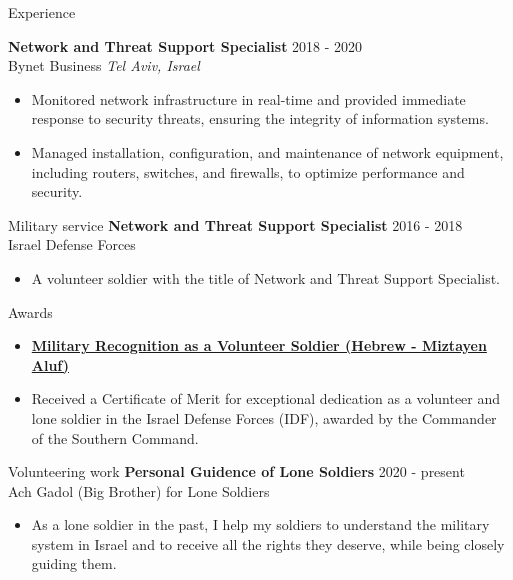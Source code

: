 \documentclass{resume}
\begin{document}
\begin{rSection}{Experience}

\textbf{Network and Threat Support Specialist} \hfill 2018 - 2020\\
Bynet Business \hfill \textit{Tel Aviv, Israel}
 \begin{itemize}
    \item Monitored network infrastructure in real-time and provided immediate response to security threats, ensuring the integrity of information systems.
    \item Managed installation, configuration, and maintenance of network equipment, including routers, switches, and firewalls, to optimize performance and security.
 \end{itemize}
\end{rSection}



\vspace{10pt}

\begin{rSection}{Military service}
	\textbf{Network and Threat Support Specialist} \hfill 2016 - 2018\\
	Israel Defense Forces 
	\begin{itemize}
		\item A volunteer soldier with the title of Network and Threat Support Specialist.
	\end{itemize}
\end{rSection} 


\vspace{10pt}

\begin{rSection}{Awards}
\begin{itemize}
 		\item\textbf{\href{https://drive.google.com/file/d/1QWiVud-gSK4n_YLskh-mxVn0zGRxDvHW/view?usp=sharing}{Military Recognition as a Volunteer Soldier (Hebrew - Miztayen Aluf)}}
		\item Received a Certificate of Merit for exceptional dedication as a volunteer and lone soldier in the Israel Defense Forces (IDF), awarded by the Commander of the Southern Command.
	\end{itemize}
\end{rSection} 

\vspace{10pt}

\begin{rSection}{Volunteering work}
	\textbf{Personal Guidence of Lone Soldiers} \hfill 2020 - present\\
	Ach Gadol (Big Brother) for Lone Soldiers
	\begin{itemize}
		\item As a lone soldier in the past, I help my soldiers to understand the military system in Israel and to receive all the rights they deserve, while being closely guiding them.
	\end{itemize}
\end{rSection} 
\end{document}
